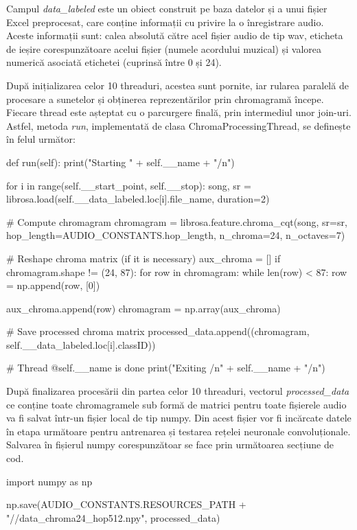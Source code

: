 \documentclass[a4paper,12pt]{report}
\begin{document}
Campul \emph{data{\_}labeled} este un obiect construit pe baza datelor 
și a unui fișier Excel preprocesat, care conține informații cu 
privire la o înregistrare audio. Aceste informații sunt: calea absolută 
către acel fișier audio de tip wav, eticheta de ieșire corespunzătoare 
acelui fișier (numele acordului muzical) și valorea numerică 
asociată etichetei (cuprinsă între 0 și 24).

După inițializarea celor 10 threaduri, acestea sunt pornite, iar 
rularea paralelă de procesare a sunetelor și obținerea reprezentărilor 
prin chromagramă începe. Fiecare thread este așteptat cu o parcurgere 
finală, prin intermediul unor join-uri. Astfel, metoda \emph{run}, implementată 
de clasa ChromaProcessingThread, se definește în felul următor:

\begin{python}
    def run(self):
        print("Starting " + self.__name + "/n")

        for i in range(self.__start_point, self.__stop):
            song, sr = librosa.load(self.__data_labeled.loc[i].file_name, duration=2)

            # Compute chromagram
            chromagram = librosa.feature.chroma_cqt(song, 
                                sr=sr, 
                                hop_length=AUDIO_CONSTANTS.hop_length, 
                                n_chroma=24,
                                n_octaves=7)

            # Reshape chroma matrix (if it is necessary)
            aux_chroma = []
            if chromagram.shape != (24, 87):
                for row in chromagram:
                    while len(row) < 87:
                        row = np.append(row, [0])

                    aux_chroma.append(row)    
                chromagram = np.array(aux_chroma)

            # Save processed chroma matrix
            processed_data.append((chromagram, self.__data_labeled.loc[i].classID))

        # Thread @self.__name is done
        print("Exiting /n" + self.__name + "/n")
\end{python}

După finalizarea procesării din partea celor 10 threaduri, vectorul \emph{processed{\_}data}
ce conține toate chromagramele sub formă de matrici pentru 
toate fișierele audio va fi salvat într-un fișier local de 
tip numpy. Din acest fișier vor fi incărcate datele în etapa următoare 
pentru antrenarea și testarea rețelei neuronale convoluționale. Salvarea 
în fișierul numpy corespunzătoar se face prin următoarea secțiune de cod.
\begin{python}
    import numpy as np

    np.save(AUDIO_CONSTANTS.RESOURCES_PATH +
            "//data_chroma24_hop512.npy", processed_data)

\end{python}
\end{document}
